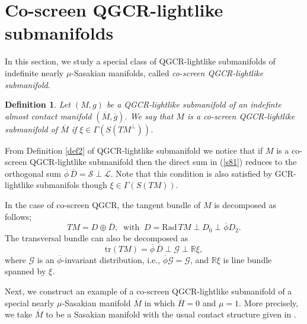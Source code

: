 \documentclass[reqno, 12pt]{amsart}
\numberwithin{equation}{section}
\newtheorem{definition}[theorem]{Definition}
\begin{document}
 \section{Co-screen QGCR-lightlike submanifolds}\label{Co}
In this section, we  study a special class of QGCR-lightlike submanifolds of indefinite nearly $\mu$-Sasakian manifolds, called \textit{co-screen QGCR-lightlike submanifold}.  

\begin{definition}\label{coc}
 {\rm
 Let $(M,g)$ be a QGCR-lightlike submanifold of an indefinte almost contact manifold $(\overline{M},\overline{g})$. We say that $M$ is a co-screen QGCR-lightlike submanifold of $\overline{M}$ if $\xi\in\Gamma(S(TM^{\perp}))$. 
 }
\end{definition}
From  Definition \ref{def2} of QGCR-lightlike submanifold we notice that if $M$ is a co-screen QGCR-lightlike submanifold then the direct sum in (\ref{s81}) reduces to the orthogonal sum $\overline{\phi} \,\overline{D}=  \mathcal{S}\perp \mathcal{L}$. Note that this condition is also satisfied by GCR-lightlike submanifols though $\xi\in\Gamma(S(TM))$. 

In the case of co-screen QGCR, the tangent bundle of $M$ is decomposed as follows; 
\begin{equation}
 TM=D\oplus\overline{D},\;\; \mbox{with}\;\; D=\mathrm{Rad}\, TM\perp D_{0}\perp\overline{\phi}D_{2}.
\end{equation}
The transversal bundle can also be decomposed as
\begin{equation}
\mathrm{tr}(TM)= \overline{\phi}\, \overline{D}\perp \mathcal{G}\perp \mathbb{R}\xi, 
\end{equation}
where $\mathcal{G}$ is an $\overline{\phi}$-invariant distribution, i.e., $\overline{\phi}\mathcal{G}=\mathcal{G}$, and $\mathbb{R}\xi$ is  line bundle spanned by $\xi$.

 Next, we construct an example of a co-screen QGCR-lightlike submanifold of a special nearly $\mu$-Sasakian manifold   $\overline{M}$ in which  $\overline{H}=0$ and $\mu=1$. More precisely, we take $\overline{M}$ to be a Sasakian manifold with the usual contact structure given in \cite{ds2}.
 
\end{document}
